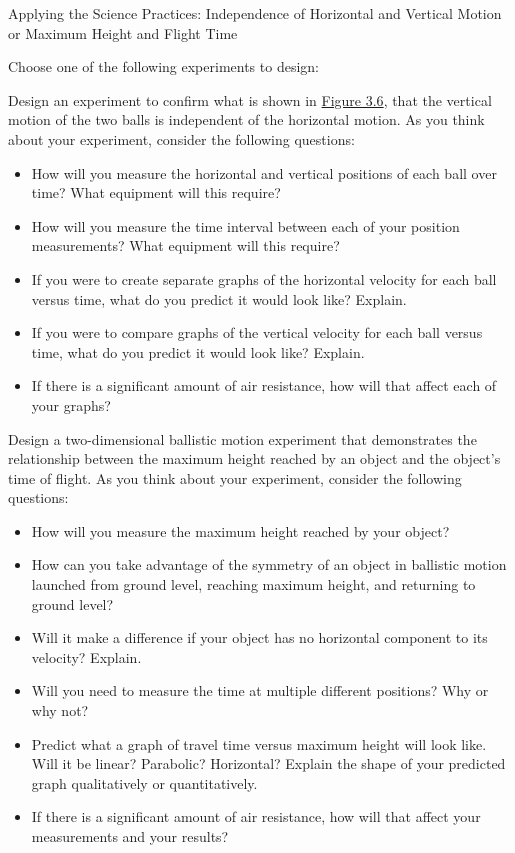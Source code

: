 \documentclass[
]{book}
\providecommand{\tightlist}{%
  \setlength{\itemsep}{0pt}\setlength{\parskip}{0pt}}
\newenvironment{note}{}{}
\begin{document}
\hypertarget{fs-id1909528}{}
\begin{note}

Applying the Science Practices: Independence of Horizontal and Vertical
Motion or Maximum Height and Flight Time

Choose one of the following experiments to design:

Design an experiment to confirm what is shown in \protect\hyperlink{import-auto-id1165296248287}{Figure
3.6}, that the vertical motion of the two
balls is independent of the horizontal motion. As you think about your
experiment, consider the following questions:

\begin{itemize}
\tightlist
\item
  How will you measure the horizontal and vertical positions of each
  ball over time? What equipment will this require?
\item
  How will you measure the time interval between each of your position
  measurements? What equipment will this require?
\item
  If you were to create separate graphs of the horizontal velocity for
  each ball versus time, what do you predict it would look like?
  Explain.
\item
  If you were to compare graphs of the vertical velocity for each ball
  versus time, what do you predict it would look like? Explain.
\item
  If there is a significant amount of air resistance, how will that
  affect each of your graphs?
\end{itemize}

Design a two-dimensional ballistic motion experiment that demonstrates
the relationship between the maximum height reached by an object and the
object's time of flight. As you think about your experiment, consider
the following questions:

\begin{itemize}
\tightlist
\item
  How will you measure the maximum height reached by your object?
\item
  How can you take advantage of the symmetry of an object in ballistic
  motion launched from ground level, reaching maximum height, and
  returning to ground level?
\item
  Will it make a difference if your object has no horizontal component
  to its velocity? Explain.
\item
  Will you need to measure the time at multiple different positions?
  Why or why not?
\item
  Predict what a graph of travel time versus maximum height will look
  like. Will it be linear? Parabolic? Horizontal? Explain the shape of
  your predicted graph qualitatively or quantitatively.
\item
  If there is a significant amount of air resistance, how will that
  affect your measurements and your results?
\end{itemize}

\end{note}
\end{document}
